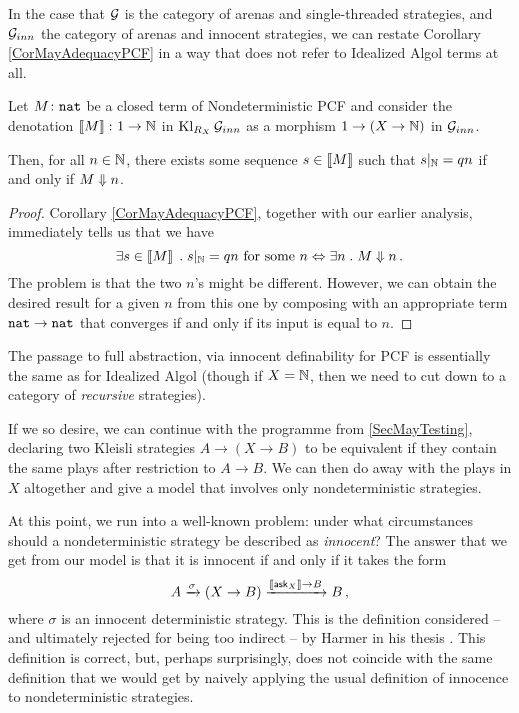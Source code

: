 In the case that $\mathcal G$ is the category of arenas and single-threaded strategies, and $\mathcal G_{inn}$ the category of arenas and innocent strategies, we can restate Corollary \ref{CorMayAdequacyPCF} in a way that does not refer to Idealized Algol terms at all.

\begin{corollary}
  Let $M\colon{\mathtt{nat}}$ be a closed term of Nondeterministic PCF and consider the denotation $\left\llbracket M\right\rrbracket \colon 1 \to \mathbb{N}$ in $\operatorname{Kl}_{R_X}\mathcal G_{inn}$ as a morphism $1 \to (X \to \mathbb{N})$ in $\mathcal G_{inn}$.  

  Then, for all $n\in\mathbb{N}$, there exists some sequence $s\in\left\llbracket M\right\rrbracket$ such that $s\vert_{\mathbb{N}} = qn$ if and only if $M\Downarrow n$.
  \label{CorMayAdequacyPcfComb}
\end{corollary}
\begin{proof}
  Corollary \ref{CorMayAdequacyPCF}, together with our earlier analysis, immediately tells us that we have
  \[
    \exists s\in \left\llbracket M\right\rrbracket \;.\; s\vert_{\mathbb{N}} = qn\text{ for some $n$} \Leftrightarrow \exists n\;.\; M\Downarrow n\,.
    \]
  The problem is that the two $n$'s might be different.  
  However, we can obtain the desired result for a given $n$ from this one by composing with an appropriate term ${\mathtt{nat}} \to {\mathtt{nat}}$ that converges if and only if its input is equal to $n$.
\end{proof}

The passage to full abstraction, via innocent definability for PCF is essentially the same as for Idealized Algol (though if $X=\mathbb{N}$, then we need to cut down to a category of \emph{recursive} strategies).

If we so desire, we can continue with the programme from \sec\ref{SecMayTesting}, declaring two Kleisli strategies $A \to (X \to B)$ to be equivalent if they contain the same plays after restriction to $A \to B$.
We can then do away with the plays in $X$ altogether and give a model that involves only nondeterministic strategies.

At this point, we run into a well-known problem: under what circumstances should a nondeterministic strategy be described as \emph{innocent}? 
The answer that we get from our model is that it is innocent if and only if it takes the form
\[
  A \xrightarrow{\sigma} (X \to B) \xrightarrow{\left\llbracket\operatorname{{\mathsf{ask}}}_X\right\rrbracket \to B} B\,,
  \]
where $\sigma$ is an innocent deterministic strategy.  
This is the definition considered -- and ultimately rejected for being too indirect -- by Harmer in his thesis \cite[]{RusssThesis}.  
This definition is correct, but, perhaps surprisingly, does not coincide with the same definition that we would get by naively applying the usual definition of innocence to nondeterministic strategies.

